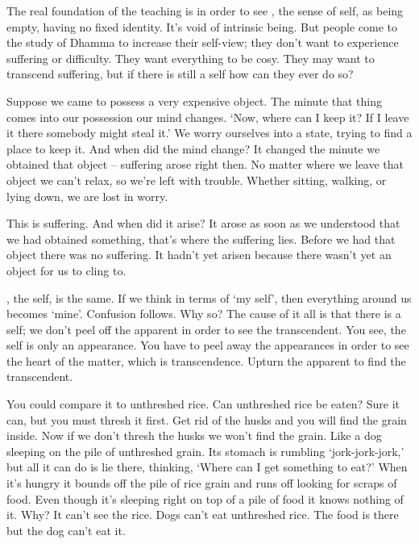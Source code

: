 The real foundation of the teaching is in order to see , the sense of self, as being empty, having no fixed identity. It's void of intrinsic being. But people come to the study of Dhamma to increase their self-view; they don't want to experience suffering or difficulty. They want everything to be cosy. They may want to transcend suffering, but if there is still a self how can they ever do so?

Suppose we came to possess a very expensive object. The minute that thing comes into our possession our mind changes. `Now, where can I keep it? If I leave it there somebody might steal it.' We worry ourselves into a state, trying to find a place to keep it. And when did the mind change? It changed the minute we obtained that object -- suffering arose right then. No matter where we leave that object we can't relax, so we're left with trouble. Whether sitting, walking, or lying down, we are lost in worry.

This is suffering. And when did it arise? It arose as soon as we understood that we had obtained something, that's where the suffering lies. Before we had that object there was no suffering. It hadn't yet arisen because there wasn't yet an object for us to cling to.

, the self, is the same. If we think in terms of `my self', then everything around us becomes `mine'. Confusion follows. Why so? The cause of it all is that there is a self; we don't peel off the apparent in order to see the transcendent. You see, the self is only an appearance. You have to peel away the appearances in order to see the heart of the matter, which is transcendence. Upturn the apparent to find the transcendent.

You could compare it to unthreshed rice. Can unthreshed rice be eaten? Sure it can, but you must thresh it first. Get rid of the husks and you will find the grain inside. Now if we don't thresh the husks we won't find the grain. Like a dog sleeping on the pile of unthreshed grain. Its stomach is rumbling `jork-jork-jork,' but all it can do is lie there, thinking, `Where can I get something to eat?' When it's hungry it bounds off the pile of rice grain and runs off looking for scraps of food. Even though it's sleeping right on top of a pile of food it knows nothing of it. Why? It can't see the rice. Dogs can't eat unthreshed rice. The food is there but the dog can't eat it.

